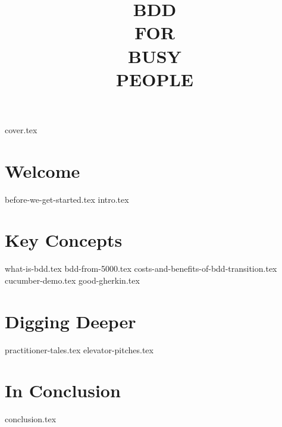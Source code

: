 \documentclass[a4paper,12pt]{report}
\title{{B}{D}{D}\\FOR\\BUSY\\PEOPLE}
\begin{document}
{cover.tex}
\tableofcontents
\part{Welcome}
{before-we-get-started.tex}
{intro.tex}
\part{Key Concepts}
{what-is-bdd.tex}
{bdd-from-5000.tex}
{costs-and-benefits-of-bdd-transition.tex}
{cucumber-demo.tex}
{good-gherkin.tex}
\part{Digging Deeper}
{practitioner-tales.tex}
{elevator-pitches.tex}
\part{In Conclusion}
{conclusion.tex}
\end{document}
